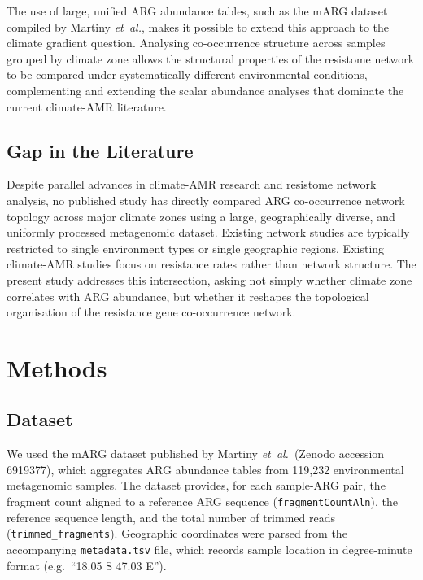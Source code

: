 \documentclass[12pt,a4paper]{article}
\begin{document}
The use of large, unified ARG abundance tables, such as the mARG dataset
compiled by Martiny \emph{et~al.}, makes it possible to extend this
approach to the climate gradient question.
Analysing co-occurrence structure across samples grouped by climate zone
allows the structural properties of the resistome network to be compared
under systematically different environmental conditions, complementing
and extending the scalar abundance analyses that dominate the current
climate-AMR literature.


\subsection{Gap in the Literature}

Despite parallel advances in climate-AMR research and resistome network
analysis, no published study has directly compared ARG co-occurrence
network topology across major climate zones using a large, geographically
diverse, and uniformly processed metagenomic dataset.
Existing network studies are typically restricted to single environment
types or single geographic regions.
Existing climate-AMR studies focus on resistance rates rather than
network structure.
The present study addresses this intersection, asking not simply whether
climate zone correlates with ARG abundance, but whether it reshapes the
topological organisation of the resistance gene co-occurrence network.



\section{Methods}\label{methods}

\subsection{Dataset}\label{sec:data}

We used the mARG dataset published by Martiny \emph{et~al.}\ (Zenodo
accession 6919377), which aggregates ARG abundance tables from 119,232
environmental metagenomic samples.
The dataset provides, for each sample-ARG pair, the fragment count
aligned to a reference ARG sequence (\texttt{fragmentCountAln}),
the reference sequence length, and the total number of trimmed reads
(\texttt{trimmed\_fragments}).
Geographic coordinates were parsed from the accompanying
\texttt{metadata.tsv} file, which records sample location in
degree-minute format (e.g.\ ``18.05 S 47.03 E'').
\end{document}
